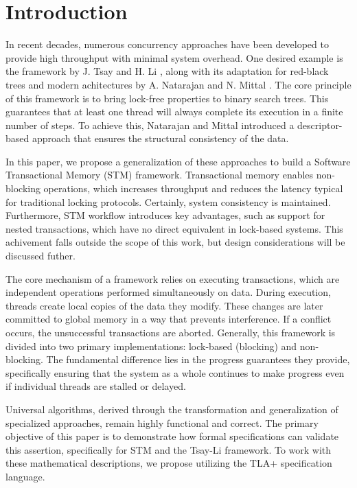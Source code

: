 \section{Introduction}
\label{sec:intro}

In recent decades, numerous concurrency approaches have been developed to provide high throughput with minimal system overhead. One desired example is the framework by J. Tsay and H. Li \cite{TsayLi}, along with its adaptation for red-black trees and modern achitectures by A. Natarajan and N. Mittal \cite{LockFreeBST}. The core principle of this framework is to bring lock-free properties to binary search trees. This guarantees that at least one thread will always complete its execution in a finite number of steps. To achieve this, Natarajan and Mittal introduced a descriptor-based approach that ensures the structural consistency of the data.

In this paper, we propose a generalization of these approaches to build a Software Transactional Memory (STM) framework. Transactional memory \cite{STM} enables non-blocking operations, which increases throughput and reduces the latency typical for traditional locking protocols. Certainly, system consistency is maintained. Furthermore, STM workflow introduces key advantages, such as support for nested transactions, which have no direct equivalent in lock-based systems. This achivement falls outside the scope of this work, but design considerations will be discussed futher.

The core mechanism of a framework relies on executing transactions, which are independent operations performed simultaneously on data. During execution, threads create local copies of the data they modify. These changes are later committed to global memory in a way that prevents interference. If a conflict occurs, the unsuccessful transactions are aborted. Generally, this framework is divided into two primary implementations: lock-based (blocking) and non-blocking. The fundamental difference lies in the progress guarantees they provide, specifically ensuring that the system as a whole continues to make progress even if individual threads are stalled or delayed.

Universal algorithms, derived through the transformation and generalization of specialized approaches, remain highly functional and correct. The primary objective of this paper is to demonstrate how formal specifications can validate this assertion, specifically for STM and the Tsay-Li framework. To work with these mathematical descriptions, we propose utilizing the TLA+ specification language.


